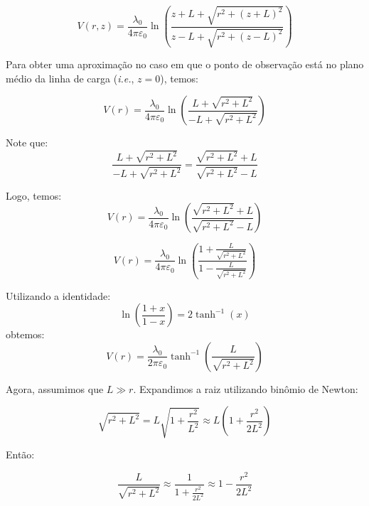 \documentclass[a4paper,12pt]{article}
\begin{document}
\begin{equation}
V(r,z) = \frac{\lambda_0}{4\pi \varepsilon_0} \ln \left( \frac{z + L + \sqrt{r^2 + (z + L)^2}}{z - L + \sqrt{r^2 + (z - L)^2}} \right)
\end{equation}

Para obter uma aproximação no caso em que o ponto de observação está no plano médio da linha de carga (\textit{i.e.}, $z = 0$), temos:

\begin{equation}
V(r) = \frac{\lambda_0}{4\pi \varepsilon_0} \ln \left( \frac{L + \sqrt{r^2 + L^2}}{-L + \sqrt{r^2 + L^2}} \right)
\end{equation}

Note que:
\begin{equation}
\frac{L + \sqrt{r^2 + L^2}}{-L + \sqrt{r^2 + L^2}} = \frac{\sqrt{r^2 + L^2} + L}{\sqrt{r^2 + L^2} - L}
\end{equation}

Logo, temos:
\begin{equation}
\boxed{V(r) = \frac{\lambda_0}{4\pi \varepsilon_0} \ln \left( \frac{\sqrt{r^2 + L^2} + L}{\sqrt{r^2 + L^2} - L} \right)}
\end{equation}

\begin{equation}
V(r) = \frac{\lambda_0}{4\pi \varepsilon_0} \ln \left( \frac{1 + \frac{L}{\sqrt{r^2 + L^2}}}{1 - \frac{L}{\sqrt{r^2 + L^2}}} \right)
\end{equation}

Utilizando a identidade:
\begin{equation}
\ln \left( \frac{1 + x}{1 - x} \right) = 2 \tanh^{-1}(x)
\end{equation}
obtemos:
\begin{equation}
V(r) = \frac{\lambda_0}{2\pi \varepsilon_0} \tanh^{-1} \left( \frac{L}{\sqrt{r^2 + L^2}} \right)
\end{equation}

Agora, assumimos que $L \gg r$. Expandimos a raiz utilizando binômio de Newton:

\begin{equation}
\sqrt{r^2 + L^2} = L \sqrt{1 + \frac{r^2}{L^2}} \approx L \left( 1 + \frac{r^2}{2L^2} \right)
\end{equation}

Então:

\begin{equation}
\frac{L}{\sqrt{r^2 + L^2}} \approx \frac{1}{1 + \frac{r^2}{2L^2}} \approx 1 - \frac{r^2}{2L^2}
\end{equation}
\end{document}
